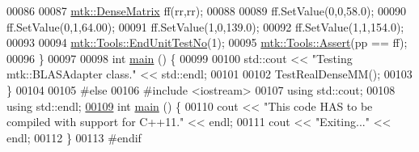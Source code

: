 \begin{DoxyCode}
00086 
00087   \hyperlink{classmtk_1_1DenseMatrix}{mtk::DenseMatrix} ff(rr,rr);
00088 
00089   ff.SetValue(0,0,58.0);
00090   ff.SetValue(0,1,64.00);
00091   ff.SetValue(1,0,139.0);
00092   ff.SetValue(1,1,154.0);
00093 
00094   \hyperlink{classmtk_1_1Tools_ad8cf0085133dd40c913fe195bc5b9694}{mtk::Tools::EndUnitTestNo}(1);
00095   \hyperlink{classmtk_1_1Tools_aa311fada9255627d06c56b1e4fedce9e}{mtk::Tools::Assert}(pp == ff);
00096 \}
00097 
00098 \textcolor{keywordtype}{int} \hyperlink{mtk__blas__adapter__test_8cc_ae66f6b31b5ad750f1fe042a706a4e3d4}{main} () \{
00099 
00100   std::cout << \textcolor{stringliteral}{"Testing mtk::BLASAdapter class."} << std::endl;
00101 
00102   TestRealDenseMM();
00103 \}
00104 
00105 \textcolor{preprocessor}{#else}
00106 \textcolor{preprocessor}{#include <iostream>}
00107 \textcolor{keyword}{using} std::cout;
00108 \textcolor{keyword}{using} std::endl;
\hypertarget{mtk__blas__adapter__test_8cc_source_l00109}{}\hyperlink{mtk__blas__adapter__test_8cc_ae66f6b31b5ad750f1fe042a706a4e3d4}{00109} \textcolor{keywordtype}{int} \hyperlink{mtk__blas__adapter__test_8cc_ae66f6b31b5ad750f1fe042a706a4e3d4}{main} () \{
00110   cout << \textcolor{stringliteral}{"This code HAS to be compiled with support for C++11."} << endl;
00111   cout << \textcolor{stringliteral}{"Exiting..."} << endl;
00112 \}
00113 \textcolor{preprocessor}{#endif}
\end{DoxyCode}
